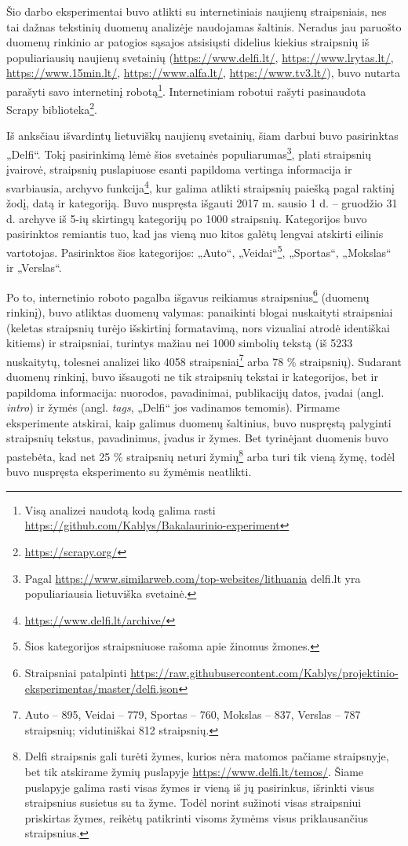 \documentclass{VUMIFInfBakalaurinis}
\begin{document}
Šio darbo eksperimentai buvo atlikti su internetiniais naujienų
straipsniais, nes tai dažnas tekstinių duomenų analizėje naudojamas
šaltinis. Neradus jau paruošto duomenų
rinkinio ar patogios sąsajos atsisiųsti didelius kiekius straipsnių iš
populiariausių naujienų svetainių
(\url{https://www.delfi.lt/}, \url{https://www.lrytas.lt/},
\url{https://www.15min.lt/}, \url{https://www.alfa.lt/},
\url{https://www.tv3.lt/}), buvo nutarta
parašyti savo internetinį robotą\footnote{Visą analizei naudotą kodą galima rasti \url{https://github.com/Kablys/Bakalaurinio-experiment}}.
Internetiniam robotui rašyti pasinaudota Scrapy biblioteka\footnote{\url{https://scrapy.org/}}.

Iš anksčiau išvardintų lietuviškų naujienų svetainių, šiam darbui buvo
pasirinktas „Delfi“. Tokį pasirinkimą lėmė šios svetainės
populiarumas\footnote{Pagal
  \url{https://www.similarweb.com/top-websites/lithuania}
  delfi.lt yra populiariausia lietuviška svetainė.}, plati straipsnių
įvairovė, straipsnių puslapiuose esanti papildoma vertinga informacija
ir svarbiausia, archyvo funkcija\footnote{\url{https://www.delfi.lt/archive/}},
kur galima atlikti straipsnių paiešką pagal raktinį žodį, datą ir
kategoriją. Buvo nuspręsta išgauti 2017 m. sausio 1 d. -- gruodžio 31 d.
archyve iš 5-ių skirtingų kategorijų po 1000 straipsnių. Kategorijos
buvo pasirinktos remiantis tuo, kad jas vieną nuo kitos
galėtų lengvai atskirti eilinis vartotojas. Pasirinktos šios
kategorijos: „Auto“, „Veidai“\footnote{Šios kategorijos straipsniuose
  rašoma apie žinomus žmones.}, „Sportas“, „Mokslas“ ir
„Verslas“.

Po to, internetinio roboto pagalba išgavus reikiamus
straipsnius\footnote{Straipsniai patalpinti
  \url{https://raw.githubusercontent.com/Kablys/projektinio-eksperimentas/master/delfi.json}}
(duomenų rinkinį), buvo atliktas duomenų valymas: panaikinti blogai
nuskaityti straipsniai (keletas straipsnių turėjo išskirtinį
formatavimą, nors vizualiai atrodė identiškai kitiems) ir straipsniai,
turintys mažiau nei 1000 simbolių tekstą (iš 5233 nuskaitytų, tolesnei
analizei liko 4058 straipsniai\footnote{Auto -- 895, Veidai -- 779,
  Sportas -- 760, Mokslas -- 837, Verslas -- 787 straipsnių;
  vidutiniškai 812 straipsnių.} arba 78 \% straipsnių). Sudarant duomenų
rinkinį, buvo išsaugoti ne tik straipsnių tekstai ir kategorijos, bet ir
papildoma informacija: nuorodos, pavadinimai, publikacijų datos, įvadai
(angl. \emph{intro}) ir žymės (angl. \emph{tags}, „Delfi“ jos vadinamos
temomis). Pirmame eksperimente atskirai, kaip galimus duomenų šaltinius,
buvo nuspręstą palyginti straipsnių tekstus, pavadinimus, įvadus ir
žymes. Bet tyrinėjant duomenis buvo pastebėta, kad net 25 \% straipsnių
neturi žymių\footnote{Delfi straipsnis gali turėti žymes, kurios nėra
  matomos pačiame straipsnyje, bet tik atskirame žymių puslapyje
  \url{https://www.delfi.lt/temos/}.
  Šiame puslapyje galima rasti visas žymes ir vieną iš jų pasirinkus,
  išrinkti visus straipsnius susietus su ta žyme. Todėl norint sužinoti
  visas straipsniui priskirtas žymes, reikėtų patikrinti visoms žymėms
  visus priklausančius straipsnius.} arba turi tik vieną žymę, todėl
buvo nuspręsta eksperimento su žymėmis neatlikti.
\end{document}
